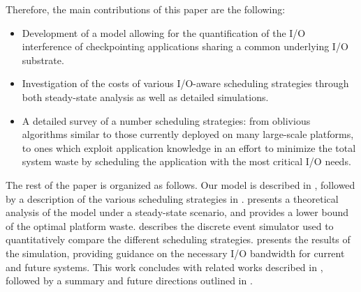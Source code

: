 Therefore, the main contributions of this paper are the following:

\begin{itemize}

\item Development of a model allowing for the quantification of
the I/O interference of checkpointing applications sharing a common underlying I/O
substrate.

\item Investigation of the costs of various I/O-aware scheduling
strategies through both steady-state analysis as well as detailed simulations.

\item A detailed survey of a number scheduling strategies: from oblivious
algorithms similar to  those currently deployed on many large-scale platforms,
to ones which exploit application knowledge in an effort to  minimize the total
system waste by scheduling the application with the most critical I/O needs.

\end{itemize}


The rest of the paper is organized as follows. Our model is described in
, followed by a description of the various scheduling
strategies in .  presents a
theoretical analysis of the model under a steady-state scenario, and provides a
lower bound of the optimal platform waste.  describes the
discrete event simulator used to quantitatively compare the different
scheduling strategies.   presents the results of the
simulation, providing guidance on the necessary I/O bandwidth for  current and
future systems. This work concludes with related works described in ,
followed by a summary and future directions outlined in .

